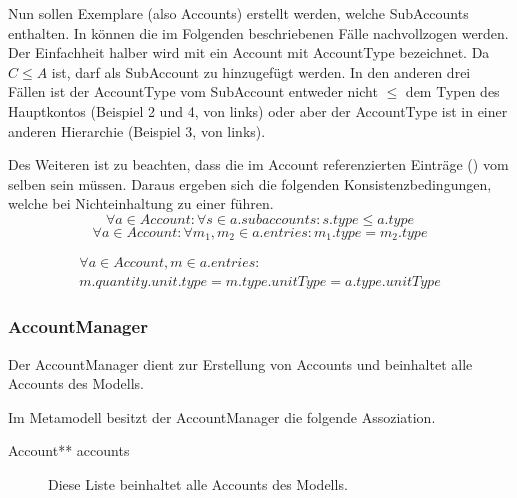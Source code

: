 Nun sollen Exemplare (also Accounts) erstellt werden, welche SubAccounts enthalten. In  können die im Folgenden beschriebenen Fälle nachvollzogen werden.
Der Einfachheit halber wird mit  ein Account  mit AccountType  bezeichnet. Da $C \leq A$ ist, darf  als SubAccount zu  hinzugefügt werden.
In den anderen drei Fällen ist der AccountType vom SubAccount entweder nicht $\leq$ dem Typen des Hauptkontos (Beispiel 2 und 4, von links) oder aber der AccountType ist in einer anderen Hierarchie (Beispiel 3, von links).


Des Weiteren ist zu beachten, dass die im Account referenzierten Einträge () vom selben 
 sein müssen. Daraus ergeben sich die folgenden Konsistenzbedingungen, 
welche bei Nichteinhaltung zu einer  führen.
\begin{equation} \forall a \in Account: \forall s \in a.subaccounts: s.type \leq a.type
\end{equation}
\begin{equation} \forall a \in Account: \forall m_1, m_2 \in a.entries: m_1.type = m_2.type
\end{equation}

\begin{equation}  
	\begin{split}
      \forall a \in Account, m \in a.entries: \\
      m.quantity.unit.type = m.type.unitType = a.type.unitType
	\end{split}
\end{equation}

\subsubsection{AccountManager}
Der AccountManager dient zur Erstellung von Accounts und beinhaltet alle Accounts des Modells.

Im Metamodell besitzt der AccountManager die folgende Assoziation.
\begin{description}
	\item[Account** accounts] Diese Liste beinhaltet alle Accounts des Modells.
\end{description}

